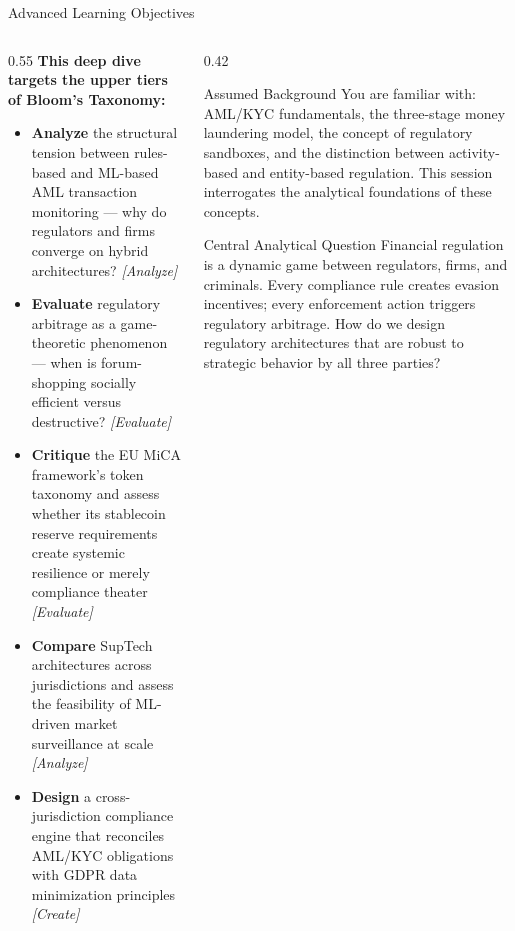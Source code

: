 \begin{frame}{Advanced Learning Objectives}
  \begin{columns}[T]
    \begin{column}{0.55\textwidth}
      \textbf{This deep dive targets the upper tiers of Bloom's Taxonomy:}
      \begin{itemize}
        \item \textbf{Analyze} the structural tension between rules-based and ML-based AML transaction monitoring --- why do regulators and firms converge on hybrid architectures? \hfill\textit{[Analyze]}
        \item \textbf{Evaluate} regulatory arbitrage as a game-theoretic phenomenon --- when is forum-shopping socially efficient versus destructive? \hfill\textit{[Evaluate]}
        \item \textbf{Critique} the EU MiCA framework's token taxonomy and assess whether its stablecoin reserve requirements create systemic resilience or merely compliance theater \hfill\textit{[Evaluate]}
        \item \textbf{Compare} SupTech architectures across jurisdictions and assess the feasibility of ML-driven market surveillance at scale \hfill\textit{[Analyze]}
        \item \textbf{Design} a cross-jurisdiction compliance engine that reconciles AML/KYC obligations with GDPR data minimization principles \hfill\textit{[Create]}
      \end{itemize}
    \end{column}
    \begin{column}{0.42\textwidth}
      \begin{block}{Assumed Background}
        You are familiar with: AML/KYC fundamentals, the three-stage money laundering model, the concept of regulatory sandboxes, and the distinction between activity-based and entity-based regulation. This session interrogates the analytical foundations of these concepts.
      \end{block}
      \vspace{0.4em}
      \begin{alertblock}{Central Analytical Question}
        Financial regulation is a dynamic game between regulators, firms, and criminals. Every compliance rule creates evasion incentives; every enforcement action triggers regulatory arbitrage. How do we design regulatory architectures that are robust to strategic behavior by all three parties?
      \end{alertblock}
    \end{column}
  \end{columns}
\end{frame}

